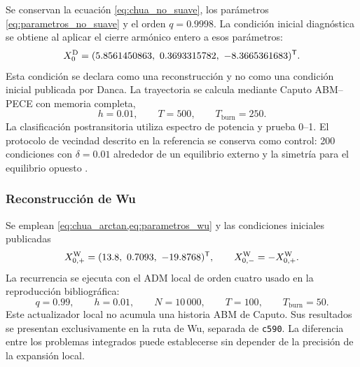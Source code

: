 Se conservan la ecuación \cref{eq:chua_no_suave}, los parámetros
\cref{eq:parametros_no_suave} y el orden \(q=0.9998\). La condición inicial
diagnóstica se obtiene al aplicar el cierre armónico entero a esos parámetros:
\begin{equation}
X_0^{\mathrm D}
=(5.8561450863,\ 0.3693315782,\ -8.3665361683)^{\mathsf T}.
\label{eq:semilla_danca_diagnostica}
\end{equation}
Esta condición se declara como una reconstrucción y no como una condición
inicial publicada por Danca. La trayectoria se calcula mediante Caputo
ABM--PECE con memoria completa,
\[
h=0.01,\qquad T=500,\qquad T_{\mathrm{burn}}=250.
\]
La clasificación postransitoria utiliza espectro de potencia y prueba 0--1.
El protocolo de vecindad descrito en la referencia se conserva como control:
200 condiciones con \(\delta=0.01\) alrededor de un equilibrio externo y la
simetría para el equilibrio opuesto \cite{Danca2017}.

\subsubsection{Reconstrucción de Wu}

Se emplean \cref{eq:chua_arctan,eq:parametros_wu} y las condiciones iniciales
publicadas
\begin{equation}
X_{0,+}^{\mathrm W}
=(13.8,\ 0.7093,\ -19.8768)^{\mathsf T},
\qquad X_{0,-}^{\mathrm W}=-X_{0,+}^{\mathrm W}.
\label{eq:semillas_wu_protocolo}
\end{equation}
La recurrencia se ejecuta con el ADM local de orden cuatro usado en la
reproducción bibliográfica:
\[
q=0.99,\qquad h=0.01,\qquad N=10\,000,\qquad
T=100,\qquad T_{\mathrm{burn}}=50.
\]
Este actualizador local no acumula una historia ABM de Caputo. Sus resultados
se presentan exclusivamente en la ruta de Wu, separada de \texttt{c590}.
La diferencia entre los problemas integrados puede establecerse sin depender
de la precisión de la expansión local.

